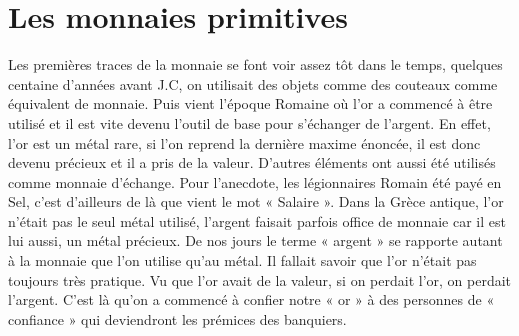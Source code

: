 \documentclass{bredele} %
\begin{document}
    \section*{Les monnaies primitives}
    Les premières traces de la monnaie se font voir assez tôt dans le temps, quelques centaine d’années avant J.C, on utilisait des objets comme des couteaux comme équivalent de monnaie. Puis vient l’époque Romaine où l’or a commencé à être utilisé et il est vite devenu l’outil de base pour s’échanger de l’argent. En effet, l’or est un métal rare, si l’on reprend la dernière maxime énoncée, il est donc devenu précieux et il a pris de la valeur. D’autres éléments ont aussi été utilisés comme monnaie d’échange. Pour l’anecdote, les légionnaires Romain été payé en Sel, c’est d’ailleurs de là que vient le mot « Salaire ».
    \newline
    Dans la Grèce antique, l’or n’était pas le seul métal utilisé, l’argent faisait parfois office de monnaie car il est lui aussi, un métal précieux. De nos jours le terme « argent » se rapporte autant à la monnaie que l’on utilise qu’au métal.
    \newline
    Il fallait savoir que l’or n’était pas toujours très pratique. Vu que l’or avait de la valeur, si on perdait l’or, on perdait l’argent.
    \newline
    C’est là qu’on a commencé à confier notre « or » à des personnes de « confiance » qui deviendront les prémices des banquiers.
\end{document}
